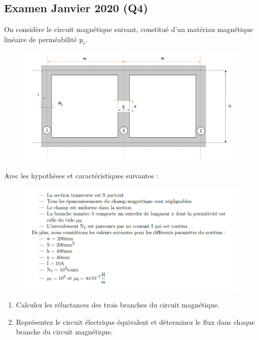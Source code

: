 \newpage

\subsection{Examen Janvier 2020 (Q4)}

On considère le circuit magnétique suivant, constitué d’un matériau magnétique linéaire de perméabilité $µ_r$. 
\begin{figure}[h!]
    \centering
    \includegraphics[width = 14cm]{TpQEx_Champs/Q4_TheoChampsJanv2020.PNG}
    \label{fig:Q4_TheoChampsJanv2020}
\end{figure}
Avec les hypothèses et caractéristiques suivantes :
\begin{figure}[h!]
    \centering
    \includegraphics[width = 13cm]{TpQEx_Champs/Q4_Caracts_TheoChampsJanv2020.PNG}
    \label{fig:Q4_Caracts_TheoChampsJanv2020}
\end{figure}

\begin{enumerate}
    \item Calculez les réluctances des trois branches du circuit magnétique.
    \item Représentez le circuit électrique équivalent et déterminez le flux dans chaque branche du circuit magnétique.
\end{enumerate}

